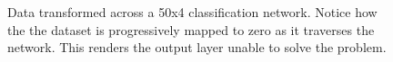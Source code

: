 \begin{figure}
{{    %
    }
    \parbox{.195\textwidth}{%
    }
  }
  \caption{Data transformed across a 50x4 \ReLU classification network. Notice how the the dataset is progressively mapped to zero as it traverses the network. This renders the output layer unable to solve the problem.}
    \label{fig:moonsReLU}
\end{figure}

